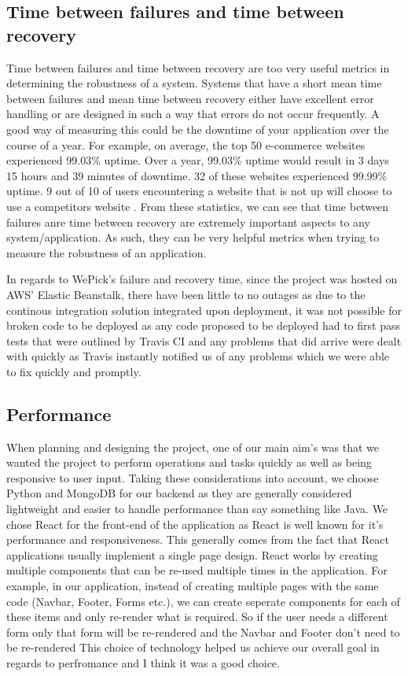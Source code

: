     \subsection{Time between failures and time between recovery}
    Time between failures and time between recovery are too very useful metrics in determining the robustness of a system. Systems that have a short mean time between failures and mean time between recovery
    either have excellent error handling or are designed in such a way that errors do not occur frequently. A good way of measuring this could be 
    the downtime of your application over the course of a year. For example, on average, the top 50 e-commerce websites experienced 99.03\% uptime. Over a year, 99.03\% uptime would result in 3 days 15 hours and 39 minutes of downtime. 32 of
    these websites experienced 99.99\% uptime. 9 out of 10 of users encountering a website that is not up will choose to use a competitors website \cite{WebsiteDowntimeStats}. From these statistics, we can see that time between failures anre time between recovery are extremely important aspects to 
    any system/application. As such, they can be very helpful metrics when trying to measure the robustness of an application. 

    In regards to WePick's failure and recovery time, since the project was hosted on AWS' Elastic Beanstalk, there have been little to no outages as due 
    to the continous integration solution integrated upon deployment, it was not possible for broken code to be deployed as any code proposed to be deployed had 
    to first pass tests that were outlined by Travis CI and any problems that did arrive were dealt with quickly as Travis instantly notified us of any problems which we were 
    able to fix quickly and promptly.

    \subsection{Performance}
    When planning and designing the project, one of our main aim's was that we wanted the project to perform operations and tasks quickly as well as being responsive to user input. Taking these considerations into account, we choose
    Python and MongoDB for our backend as they are generally considered lightweight and easier to handle performance than say something like Java. We chose React for the front-end of the application as React is well known for it's performance and
    responsiveness. This generally comes from the fact that React applications usually implement a single page design. React works by creating multiple components that can be re-used multiple times in the application. For example, in our 
    application, instead of creating multiple pages with the same code (Navbar, Footer, Forms etc.), we can create seperate components for each of these items and only re-render what is required. So if the user needs a different form only that form will
    be re-rendered and the Navbar and Footer don't need to be re-rendered This choice of technology helped us achieve our overall goal in regards to perfromance and I think it was a good choice.

